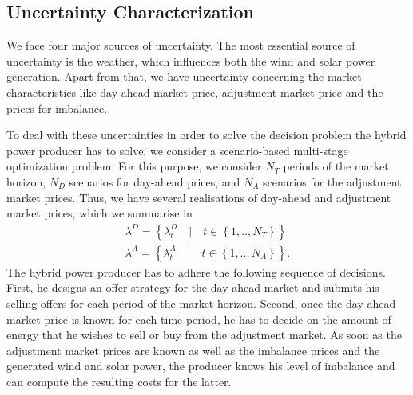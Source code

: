 \subsection{Uncertainty Characterization}

We face four major sources of uncertainty. The most essential source of uncertainty is the weather, which influences both the wind and solar power generation. Apart from that, we have uncertainty concerning the market characteristics like day-ahead market price, adjustment market price and the prices for imbalance.

To deal with these uncertainties in order to solve the decision problem the hybrid power producer has to solve, we consider a scenario-based multi-stage optimization problem. 
For this purpose, we consider $N_{T}$ periods of the market horizon, $N_{D}$ scenarios for day-ahead prices, and $N_{A}$ scenarios for the adjustment market prices. Thus, we have several realisations of day-ahead and adjustment market prices, which we summarise in
\begin{align*}
	\lambda^{D}=\left\{\lambda_{t}^{D} \quad \lvert \quad t \in \left\{1, .., N_{T}\right\}\right\}
	\\ \lambda^{A}=\left\{\lambda_{t}^{A}\quad \lvert \quad t \in \left\{1, .., N_{A}\right\}\right\}.
\end{align*}
The hybrid power producer has to adhere the following sequence of decisions. First, he designs an offer strategy for the day-ahead market and submits his selling offers for each period of the market horizon. Second, once the day-ahead market price is known for each time period, he has to decide on the amount of energy that he wishes to sell or buy from the adjustment market. As soon as the adjustment market prices are known as well as the imbalance prices and the generated wind and solar power, the producer knows his level of imbalance and can compute the resulting costs for the latter. 


